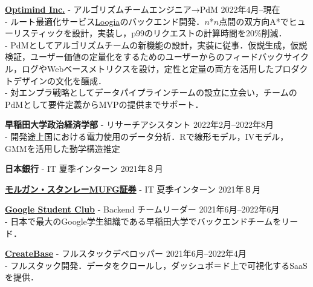 \documentclass[uplatex,dvipdfmx,a4paper,11pt]{jsarticle}
\begin{document}
{\bf \href{https://www.optimind.tech/}{Optimind Inc.}} { - アルゴリズムチームエンジニア→PdM} \hfill {2022年4月--現在} 
\\- ルート最適化サービス\href{https://loogia.jp/?_ga=2.72237267.1726635224.1669133714-1962149220.1665458028}{Loogia}のバックエンド開発．$n$*$n$点間の双方向A*でヒューリスティックを設計，実装し，p99のリクエストの計算時間を20\%削減．
\\- PdMとしてアルゴリズムチームの新機能の設計，実装に従事．仮説生成，仮説検証，ユーザー価値の定量化をするためのユーザーからのフィードバックサイクル，ログやWebベースメトリクスを設け，定性と定量の両方を活用したプロダクトデザインの文化を醸成．
\\- 対エンプラ戦略としてデータパイプラインチームの設立に立会い，チームのPdMとして要件定義からMVPの提供までサポート．

{ \bf\textcolor{blue(pigment)}{早稲田大学政治経済学部}} { - リサーチアシスタント} \hfill {2022年2月--2022年8月} 
\\- 開発途上国における電力使用のデータ分析．Rで線形モデル，IVモデル，GMMを活用した動学構造推定

{\bf\textcolor{blue(pigment)}{日本銀行}}{ - IT 夏季インターン} \hfill { 2021年８月} 

{\bf \href{https://www.morganstanley.co.jp/ja}{モルガン・スタンレーMUFG証券}}{ - IT 夏季インターン} \hfill {2021年８月} 

{ \bf\href{https://gdsc.community.dev/waseda-university/}{Google Student Club}} { - Backend チームリーダー} \hfill {2021年6月--2022年6月} 
\\- 日本で最大のGoogle学生組織である早稲田大学でバックエンドチームをリード．%

{\bf \href{https://createbase.work/}{CreateBase}} { - フルスタックデベロッパー} \hfill {2021年6月--2022年4月} 
\\- フルスタック開発．データをクロールし，ダッシュボ＝ド上で可視化するSaaSを提供．
\end{document}
